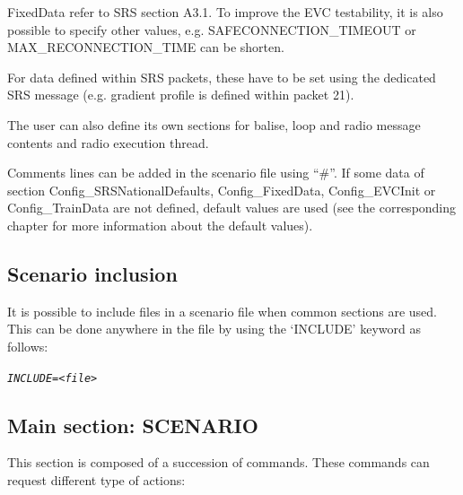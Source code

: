 FixedData refer to SRS section A3.1. To improve the EVC testability, it is also possible to specify other values, e.g. SAFECONNECTION\_TIMEOUT or MAX\_RECONNECTION\_TIME can be shorten.

For data defined within SRS packets, these have to be set using the dedicated SRS message (e.g. gradient profile is defined within packet 21).

The user can also define its own sections for balise, loop and radio message contents and radio execution thread.

Comments lines can be added in the scenario file using “\#”.
If some data of section Config\_SRSNationalDefaults, Config\_FixedData, Config\_EVCInit or Config\_TrainData are not defined, default values are used (see the corresponding chapter for more information about the default values).

\subsection{Scenario inclusion}

It is possible to include files in a scenario file when common sections are used. This can be done anywhere in the file by using the ‘INCLUDE’ keyword as follows:

\emph{\texttt{INCLUDE=<file>}}

\subsection{Main section: SCENARIO}

This section is composed of a succession of commands. These commands can request different type of actions:

